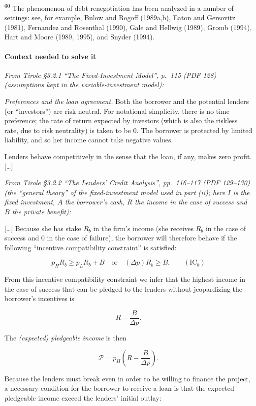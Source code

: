 \documentclass[11pt,a4paper]{article}
\begin{document}
\textsuperscript{60} The phenomenon of debt renegotiation has been analyzed in a number of settings:
see, for example, Bulow and Rogoff (1989a,b), Eaton and Gersovitz (1981), Fernandez and Rosenthal
(1990), Gale and Hellwig (1989), Gromb (1994), Hart and Moore (1989, 1995), and Snyder (1994).

\paragraph{Context needed to solve it}

\emph{From Tirole §3.2.1 ``The Fixed-Investment Model'', p.~115 (PDF 128) (assumptions kept in the
variable-investment model):}

\emph{Preferences and the loan agreement.} Both the borrower and the potential lenders (or
``investors'') are risk neutral. For notational simplicity, there is no time preference; the rate of
return expected by investors (which is also the riskless rate, due to risk neutrality) is taken to
be 0. The borrower is protected by limited liability, and so her income cannot take negative values.

Lenders behave competitively in the sense that the loan, if any, makes zero profit. {[}\ldots{]}

\emph{From Tirole §3.2.2 ``The Lenders' Credit Analysis'', pp.~116--117 (PDF 129--130) (the
``general theory'' of the fixed-investment model used in part (ii); here \(I\) is the fixed
investment, \(A\) the borrower's cash, \(R\) the income in the case of success and \(B\) the private
benefit):}

{[}\ldots{]} Because she has stake \(R_b\) in the firm's income (she receives \(R_b\) in the case of
success and 0 in the case of failure), the borrower will therefore behave if the following
``incentive compatibility constraint'' is satisfied:

\[p_H R_b \geqslant p_L R_b + B \quad \text{or} \quad (\Delta p) R_b \geqslant B. \qquad (\text{IC}_b)\]

From this incentive compatibility constraint we infer that the highest income in the case of success
that can be pledged to the lenders without jeopardizing the borrower's incentives is

\[R - \frac{B}{\Delta p}.\]

The \emph{(expected) pledgeable income} is then

\[\mathcal{P} = p_H\left(R - \frac{B}{\Delta p}\right).\]

Because the lenders must break even in order to be willing to finance the project, a necessary
condition for the borrower to receive a loan is that the expected pledgeable income exceed the
lenders' initial outlay:
\end{document}
